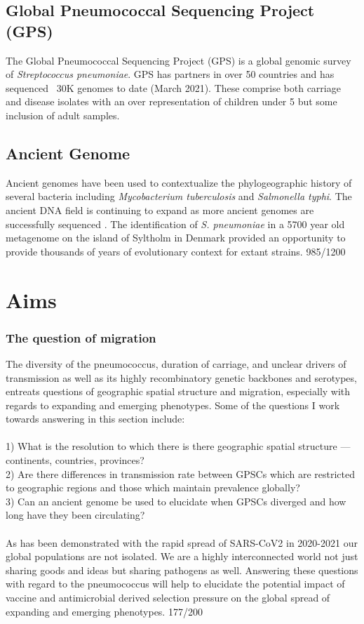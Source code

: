 \documentclass{article}
\begin{document}
\subsection{Global Pneumococcal Sequencing Project (GPS)}
The Global Pneumococcal Sequencing Project (GPS) is a global genomic survey of \textit{Streptococcus pneumoniae}. GPS has partners in over 50 countries and has sequenced ~30K  genomes to date (March 2021). These comprise both carriage and disease isolates with an over representation of children under 5 but some inclusion of adult samples.
\subsection{Ancient Genome }
Ancient genomes have been used to contextualize the phylogeographic history of several bacteria including \textit{Mycobacterium tuberculosis} and \textit{Salmonella typhi}\cite{bosPreColumbianMycobacterialGenomes2014,vageneSalmonellaEntericaGenomes2018}. The ancient DNA field is continuing to expand as more ancient genomes are successfully sequenced \cite{neukamm2000yearoldPathogenGenomes2020}. The identification of \textit{S. pneumoniae} in a 5700 year old metagenome on the island of Syltholm in Denmark provided an opportunity to provide thousands of years of evolutionary context for extant strains\cite{jensen5700YearoldHuman2019}. 
985/1200
\section{Aims}
\subsubsection{The question of migration} 
The diversity of the pneumococcus, duration of carriage, and unclear drivers of transmission as well as its highly recombinatory genetic backbones and serotypes, entreats questions of geographic spatial structure and migration, especially with regards to expanding and emerging phenotypes. Some of the questions I work towards answering in this section include:
\\
\\1) What is the resolution to which there is there geographic spatial structure --- continents, countries, provinces? 
\\2) Are there differences in transmission rate between GPSCs which are restricted to geographic regions and those which maintain prevalence globally?  
\\3) Can an ancient genome be used to elucidate when GPSCs diverged and how long have they been circulating? 
\\
\\As has been demonstrated with the rapid spread of SARS-CoV2 in 2020-2021 our global populations are not isolated. We are a highly interconnected world not just sharing goods and ideas but sharing pathogens as well. Answering these questions with regard to the pneumococcus will help to elucidate the potential impact of vaccine and antimicrobial derived selection pressure on the global spread of expanding and emerging phenotypes. 
177/200
\end{document}
